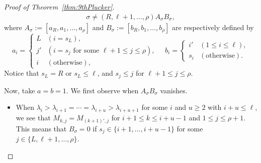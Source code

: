 \documentclass[12pt]{amsart}%
\theoremstyle{definition}
\begin{document}
\begin{proof}[Proof of Theorem~\ref{thm:9thPlucker}]
\begin{align}
{{\sigma \ne (R,\ell+1,\ldots,{\rho})}}
A_{\sigma}B_{\sigma},
\end{align}
where %
$A_{\sigma}:=[a_R,a_1,\ldots,a_{\rho}]$
and $B_{\sigma}:=[b_R,b_1,\ldots,b_{\rho}]$ 
are respectively defined by 
\[
a_i
=\begin{cases}
L & (i=s_L),\\    
j' & (\text{$i=s_j$ for some $\ell+1\le j\le \rho$}),\\
i & (\text{otherwise}),
\end{cases}
\quad 
b_i
=\begin{cases}
i' & (1\le i\le \ell),\\
s_i & (\text{otherwise}).
\end{cases}
\]
Notice that $s_L=R$ or $s_L\le\ell$,
and $s_j\le j$ for $\ell+1\le j\le \rho$. 

Now, take $a=b=1$.
We first observe when $A_{\sigma}B_{\sigma}$ vanishes.
\begin{itemize}
\item When $\lambda_i>\lambda_{i+1}=\cdots=\lambda_{i+u}>\lambda_{i+u+1}$ for some $i$ and $u\ge 2$ with $i+u\le \ell$,
we see that $M_{k,j}=M_{(k+1)',j}$ for $i+1\le k\le i+u-1$ and $1\le j\le \rho+1$. 
This means that $B_{\sigma}=0$ if  
$s_j\in\{i+1,\ldots,i+u-1\}$ for some $j\in\{L,\ell+1,\ldots,\rho\}$.


\end{itemize}
\end{proof}
\end{document}
